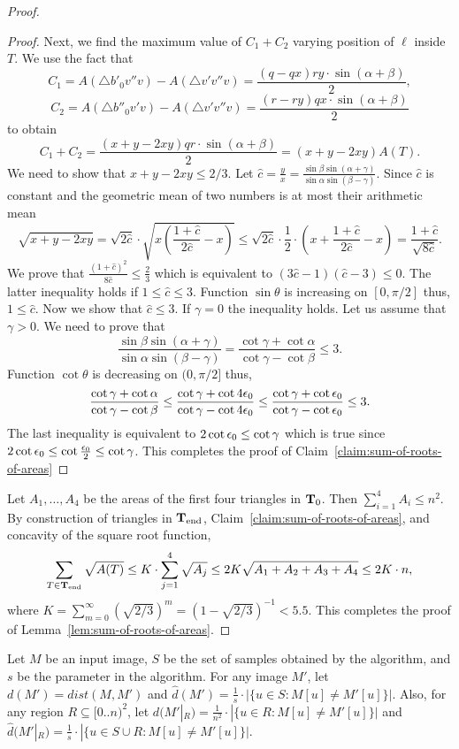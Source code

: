 \documentclass[11pt,english]{article}
\numberwithin{figure}{section}
\newcommand{\dis}{dist}
\newcommand{\integerset}[1]{[0..{#1})}
\newcommand{\domain}{\integerset{n}^2}
\newcommand{\Tend}{{\bf T}_{\text{end}}}
\newcommand{\Tstart}{{\bf T}_0}
\newcommand{\dout}{\hat{d}}
\begin{document}
\begin{proof}
\begin{proof}
{Next, we find the maximum value of $C_1+C_2$ varying position of $\ell$ inside $T$. We use the fact that
$$
C_1=A(\bigtriangleup b'_0v''v)-A(\bigtriangleup v'v''v)=\frac{(q-qx)ry\cdot\sin(\alpha+\beta)}{2},
$$ $$
C_2=A(\bigtriangleup b''_0v'v)-A(\bigtriangleup v'v''v)=\frac{(r-ry)qx\cdot\sin(\alpha+\beta)}{2}
$$ to obtain
$$
C_1+C_2=\frac{(x+y-2xy)qr\cdot\sin(\alpha+\beta)}{2}=(x+y-2xy)A(T).
$$
We need to show that $x+y-2xy\leq 2/3$. Let $\hat c=\frac y x=\frac{\sin\beta\sin(\alpha+\gamma)}{\sin\alpha\sin(\beta-\gamma)}$. Since $\hat c$ is constant and the geometric mean of two numbers is at most their arithmetic mean $$\sqrt{x+y-2xy}=\sqrt{2\hat c} \cdot \sqrt{x(\frac{1+\hat c}{2\hat c}-x)}\leq \sqrt{2\hat c}\cdot \frac 1 2\cdot (x+\frac{1+\hat c}{2\hat c}-x)=\frac{1+\hat c}{\sqrt{8\hat c}}.$$ We prove that $\frac{(1+\hat c)^2}{8\hat c}\leq \frac 2 3$ which is equivalent to $(3\hat c-1)(\hat c-3)\leq0$. The latter inequality holds if $1\leq\hat c\leq3.$ Function $\sin\theta$ is increasing on $[0,\pi/2]$ thus, $1\leq\hat c.$ Now we show that $\hat c\leq3.$ If $\gamma=0$ the inequality holds. Let us assume that $\gamma>0.$
We need to prove that
$$
\frac{\sin\beta\sin(\alpha+\gamma)}{\sin\alpha\sin(\beta-\gamma)}=\frac{\cot\gamma+\cot\alpha}{\cot\gamma-\cot\beta}\leq3.
$$
Function $\cot\theta$ is decreasing on $(0,\pi/2]$ thus,
$$
\frac{\cot\gamma+\cot\alpha}{\cot\gamma-\cot\beta}\leq\frac{\cot\gamma+\cot4{\epsilon_0}}{\cot\gamma-\cot4{\epsilon_0}}\leq\frac{\cot\gamma+\cot{\epsilon_0}}{\cot\gamma-\cot{\epsilon_0}}\leq3.
$$
The last inequality is equivalent to $2\cot{\epsilon_0}\leq\cot\gamma$ which is true since $2\cot{\epsilon_0}\leq\cot\frac {{\epsilon_0}} 2\leq \cot\gamma$. This completes the proof of Claim~\ref{claim:sum-of-roots-of-areas}}\end{proof}

Let $A_1,\dots,A_4$ be the areas of the first four triangles in $\Tstart$. Then $\sum_{i=1}^4 A_i\leq n^2$.
By construction of triangles in $\Tend$, Claim~\ref{claim:sum-of-roots-of-areas}, and concavity of the square root function,
$$
\sum_{T\in \Tend} \sqrt{A(T)}\leq
K\cdot\sum_{j=1}^4 \sqrt{A_j}\leq 2K\sqrt{A_1+A_2+A_3+A_4}\leq 2K\cdot n,
$$
where $K=\sum_{m=0}^{\infty}(\sqrt{2/3})^m=(1-\sqrt{2/3})^{-1}<5.5$.
This completes the proof of Lemma~\ref{lem:sum-of-roots-of-areas}.
\end{proof}


Let $M$ be an input image, $S$ be the set of samples obtained by the algorithm, and $s$ be the parameter in the algorithm.
For any image $M'$, let $d(M')=\dis(M,M')$ and
$\dout(M')=\frac 1 s \cdot |\{u\in S : M[u]\neq M'[u]\}|.$
Also, for any region $R\subseteq\domain$, let $d(M'|_R)=\frac 1 {n^2} \cdot |\{u\in R : M[u]\neq M'[u]\}|$
and $\dout(M'|_R)=\frac 1 s \cdot |\{u\in S\cup R : M[u]\neq M'[u]\}|.$
\fi
\end{document}
